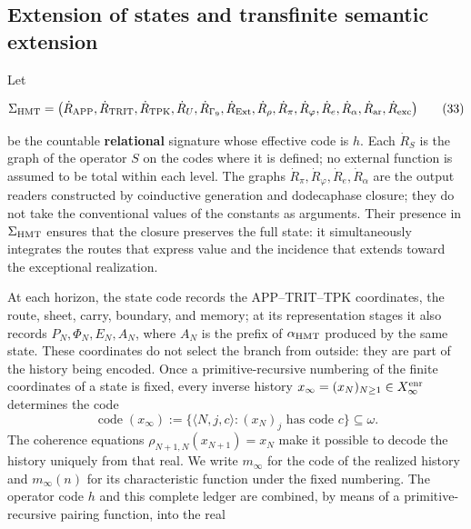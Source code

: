 \subsection{Extension of states and transfinite semantic extension}

Let

\[
 \Sigma_{\rm HMT}
 =\bigl(\dot R_{\rm APP},\dot R_{\rm TRIT},\dot R_{\rm TPK},
 \dot R_{U},\dot R_{\Gamma_9},\dot R_{\rm Ext},\dot R_\rho,
 \dot R_{\pi},\dot R_{\varphi},\dot R_e,\dot R_{\alpha},
 \dot R_{\rm ar},\dot R_{\rm exc}\bigr)
\tag{33}\label{hmtfg:base:eq:ch-signatura}
\]

be the countable \textbf{relational} signature whose effective code is \(h\).
Each \(\dot R_S\) is the graph of the operator \(S\) on the codes where it is
defined; no external function is assumed to be total within each level. The
graphs \(\dot R_{\pi},\dot R_{\varphi},\dot R_e,\dot R_{\alpha}\) are the
output readers constructed by coinductive generation and dodecaphase closure;
they do not take the conventional values of the constants as arguments. Their
presence in \(\Sigma_{\rm HMT}\) ensures that the closure preserves the full
state: it simultaneously integrates the routes that express value and the
incidence that extends toward the exceptional realization.

At each horizon, the state code records the APP--TRIT--TPK coordinates, the
route, sheet, carry, boundary, and memory; at its representation stages it also
records \(P_N,\Phi_N,E_N,A_N\), where \(A_N\) is the prefix of
\(\alpha_{\rm HMT}\) produced by the same state. These coordinates do not
select the branch from outside: they are part of the history being encoded.
Once a primitive-recursive numbering of the finite coordinates of a state is
fixed, every inverse history
\(x_\infty=(x_N)_{N\geq1}\in X_\infty^{\rm enr}\) determines the code
\[
 \operatorname{code}(x_\infty)
 :=\{\langle N,j,c\rangle:(x_N)_j\text{ has code }c\}\subseteq\omega.
\]
The coherence equations
\(\rho_{N+1,N}(x_{N+1})=x_N\) make it possible to decode the history uniquely
from that real. We write \(m_\infty\) for the code of the realized history and
\(m_\infty(n)\) for its characteristic function under the fixed numbering.
The operator code \(h\) and this complete ledger are combined, by means of a
primitive-recursive pairing function, into the real


